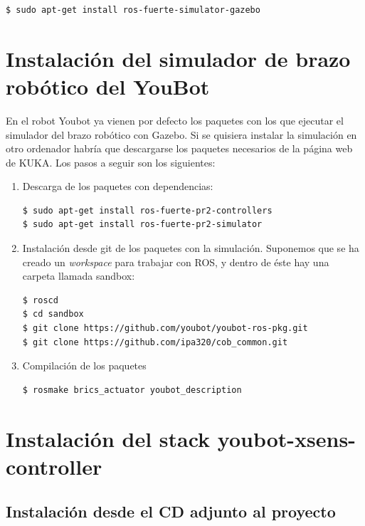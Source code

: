 \documentclass[12pt, a4paper]{report}
\begin{document}
\begin{verbatim}
$ sudo apt-get install ros-fuerte-simulator-gazebo
\end{verbatim}

\section{Instalación del simulador de brazo robótico del YouBot}

En el robot Youbot ya vienen por defecto los paquetes con los que ejecutar el simulador del brazo robótico con Gazebo. Si se quisiera instalar la simulación en otro ordenador habría que descargarse los paquetes necesarios de la página web de KUKA. Los pasos a seguir son los siguientes:

\begin{enumerate}
\item Descarga de los paquetes con dependencias:

\begin{verbatim}
$ sudo apt-get install ros-fuerte-pr2-controllers
$ sudo apt-get install ros-fuerte-pr2-simulator
\end{verbatim}

\item Instalación desde git de los paquetes con la simulación. Suponemos que se ha creado un \textit{workspace} para trabajar con ROS, y dentro de éste hay una carpeta llamada sandbox:

\begin{verbatim}
$ roscd
$ cd sandbox
$ git clone https://github.com/youbot/youbot-ros-pkg.git
$ git clone https://github.com/ipa320/cob_common.git
\end{verbatim}

\item Compilación de los paquetes

\begin{verbatim}
$ rosmake brics_actuator youbot_description
\end{verbatim}

\end{enumerate}



\section{Instalación del stack youbot-xsens-controller}



\subsection{Instalación desde el CD adjunto al proyecto}
\end{document}
